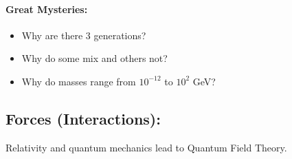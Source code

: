 \paragraph{Great Mysteries:}

\begin{itemize}
\item Why are there 3 generations?
\item Why do some mix and others not?
\item Why do masses range from $10^{-12}$ to $10^2$ \si{\GeV}?
\end{itemize}

\subsection{Forces (Interactions):}
Relativity and quantum mechanics lead to Quantum Field Theory.

